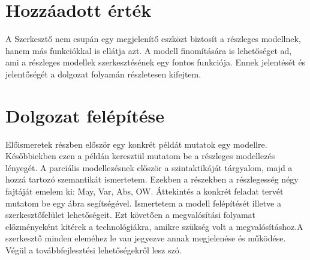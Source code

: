 \section{Hozzáadott érték}	
A Szerkesztő nem csupán egy megjelenítő eszközt biztosít a részleges modellnek, hanem más funkciókkal is ellátja azt. A modell finomítására is lehetőséget ad, ami a részleges modellek szerkesztésének egy fontos funkciója. Ennek jelentését és jelentőségét a dolgozat folyamán részletesen kifejtem.

\section{Dolgozat felépítése}
Előismeretek részben először egy konkrét példát mutatok  egy modellre. Későbbiekben ezen a példán keresztül mutatom be a részleges modellezés lényegét. A parciális modellezésnek először a szintaktikáját tárgyalom, majd a hozzá tartozó szemantikát ismertetem. Ezekben a részekben a részlegesség négy fajtáját emelem ki: May, Var, Abs, OW. Áttekintés a konkrét feladat tervét mutatom be egy ábra segítségével. Ismertetem a modell felépítését illetve a szerkesztőfelület lehetőségeit. Ezt követően a megvalósítási folyamat előzményeként kitérek a technológiákra, amikre szükség volt a megvalósításhoz.A szerkesztő minden eleméhez le van jegyezve annak megjelenése és működése. Végül a továbbfejlesztési lehetőségekről lesz szó. 

